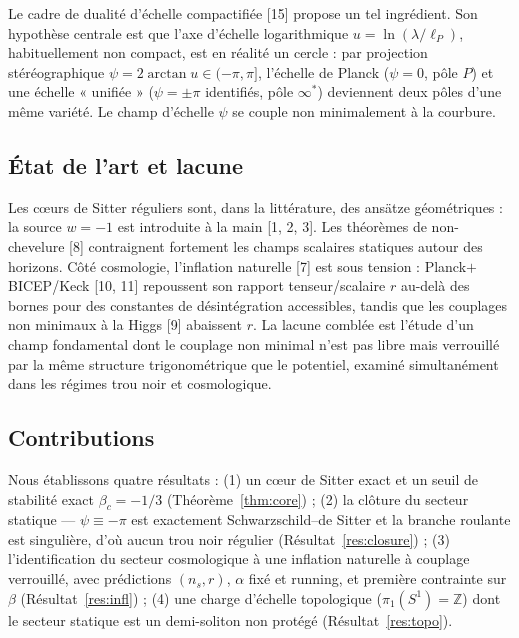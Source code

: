 \documentclass[11pt,a4paper]{article}
\theoremstyle{plain}
\theoremstyle{remark}
\begin{document}
Le cadre de dualit\'e d'\'echelle compactifi\'ee [15] propose un tel ingr\'edient. Son
hypoth\`ese centrale est que l'axe d'\'echelle logarithmique $u=\ln(\lambda/\ell_P)$,
habituellement non compact, est en r\'ealit\'e un cercle : par projection st\'er\'eographique
$\psi=2\arctan u\in(-\pi,\pi]$, l'\'echelle de Planck ($\psi=0$, p\^ole $P$) et une \'echelle
« unifi\'ee » ($\psi=\pm\pi$ identifi\'es, p\^ole $\infty^*$) deviennent deux p\^oles d'une
m\^eme vari\'et\'e. Le champ d'\'echelle $\psi$ se couple non minimalement \`a la courbure.

\subsection{\'Etat de l'art et lacune}
Les c\oe urs de Sitter r\'eguliers sont, dans la litt\'erature, des ans\"atze g\'eom\'etriques :
la source $w=-1$ est introduite \`a la main [1, 2, 3]. Les th\'eor\`emes de non-chevelure [8]
contraignent fortement les champs scalaires statiques autour des horizons. C\^ot\'e
cosmologie, l'inflation naturelle [7] est sous tension : Planck$+$BICEP/Keck [10, 11]
repoussent son rapport tenseur/scalaire $r$ au-del\`a des bornes pour des constantes de
d\'esint\'egration accessibles, tandis que les couplages non minimaux \`a la Higgs [9]
abaissent $r$. La lacune combl\'ee est l'\'etude d'un champ fondamental dont le couplage non
minimal n'est pas libre mais verrouill\'e par la m\^eme structure trigonom\'etrique que le
potentiel, examin\'e simultan\'ement dans les r\'egimes trou noir et cosmologique.

\subsection{Contributions}
Nous \'etablissons quatre r\'esultats : (1) un c\oe ur de Sitter exact et un seuil de
stabilit\'e exact $\beta_c=-1/3$ (Th\'eor\`eme~\ref{thm:core}) ; (2) la cl\^oture du secteur
statique --- $\psi\equiv-\pi$ est exactement Schwarzschild--de Sitter et la branche
roulante est singuli\`ere, d'o\`u aucun trou noir r\'egulier (R\'esultat~\ref{res:closure}) ;
(3) l'identification du secteur cosmologique \`a une inflation naturelle \`a couplage
verrouill\'e, avec pr\'edictions $(n_s,r)$, $\alpha$ fix\'e et running, et premi\`ere contrainte
sur $\beta$ (R\'esultat~\ref{res:infl}) ; (4) une charge d'\'echelle topologique
($\pi_1(S^1)=\mathbb{Z}$) dont le secteur statique est un demi-soliton non prot\'eg\'e
(R\'esultat~\ref{res:topo}).

\end{document}
